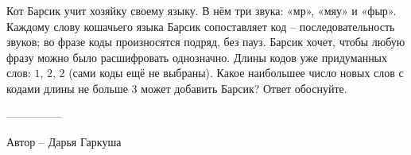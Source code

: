 \question
Кот Барсик учит хозяйку своему языку. В нём три звука: «мр», «мяу» и «фыр». Каждому слову кошачьего языка Барсик сопоставляет код -- последовательность звуков; во фразе коды произносятся подряд, без пауз. Барсик хочет, чтобы любую фразу можно было расшифровать однозначно. Длины кодов уже придуманных слов: $1$, $2$, $2$ (сами коды ещё не выбраны). Какое наибольшее число новых слов с кодами длины не больше $3$ может добавить Барсик? Ответ обоснуйте.

---------------

Автор -- Дарья Гаркуша